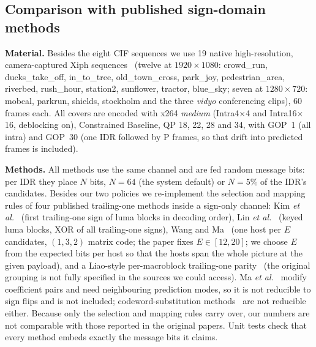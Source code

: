\subsection{Comparison with published sign-domain methods}
\label{sec:eval-compare}

\textbf{Material.} Besides the eight CIF sequences we use 19 native high-resolution, camera-captured Xiph sequences~\cite{xiph_media} (twelve at $1920\times1080$: crowd\_run, ducks\_take\_off, in\_to\_tree, old\_town\_cross, park\_joy, pedestrian\_area, riverbed, rush\_hour, station2, sunflower, tractor, blue\_sky; seven at $1280\times720$: mobcal, parkrun, shields, stockholm and the three \emph{vidyo} conferencing clips), 60 frames each. All covers are encoded with x264 \emph{medium} (Intra4$\times$4 and Intra16$\times$16, deblocking on), Constrained Baseline, QP 18, 22, 28 and 34, with GOP~1 (all intra) and GOP~30 (one IDR followed by P frames, so that drift into predicted frames is included).

\textbf{Methods.} All methods use the same channel and are fed random message bits: per IDR they place $N$ bits, $N=64$ (the system default) or $N=5\%$ of the IDR's candidates. Besides our two policies we re-implement the selection and mapping rules of four published trailing-one methods inside a sign-only channel: Kim \emph{et al.}~\cite{kim2007t1} (first trailing-one sign of luma blocks in decoding order), Lin \emph{et al.}~\cite{lin2012cavlc} (keyed luma blocks, XOR of all trailing-one signs), Wang and Ma~\cite{wang2018cavlc} (one host per $E$ candidates, $(1,3,2)$ matrix code; the paper fixes $E\in[12,20]$; we choose $E$ from the expected bits per host so that the hosts span the whole picture at the given payload), and a Liao-style per-macroblock trailing-one parity~\cite{liao2009t1,liao2012t1journal} (the original grouping is not fully specified in the sources we could access). Ma \emph{et al.}~\cite{ma2010drift} modify coefficient pairs and need neighbouring prediction modes, so it is not reducible to sign flips and is not included; codeword-substitution methods~\cite{mobasseri2007} are not reducible either. Because only the selection and mapping rules carry over, our numbers are not comparable with those reported in the original papers. Unit tests check that every method embeds exactly the message bits it claims.

